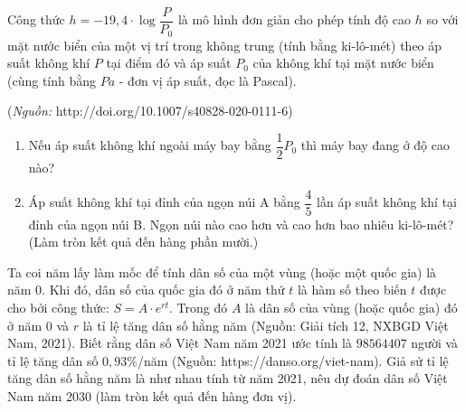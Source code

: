 \begin{bt}%
	Công thức $h=-19{,}4\cdot\log\dfrac{P}{P_0}$ là mô hình đơn giản cho phép tính độ cao $h$ so với mặt nước biển của một vị trí trong không trung (tính bằng ki-lô-mét) theo áp suất không khí $P$ tại điểm đó và áp suất $P_0$ của không khí tại mặt nước biển (cùng tính bằng $Pa$ - đơn vị áp suất, đọc là Pascal).
	\begin{center}
		(\textit{Nguồn:}  http://doi.org/10.1007/s40828-020-0111-6)
	\end{center}
	\begin{enumerate}
		\item Nếu áp suất không khí ngoài máy bay bằng $\dfrac{1}{2}P_0$ thì máy bay đang ở độ cao nào?
		\item Áp suất không khí tại đỉnh của ngọn núi A bằng $\dfrac{4}{5}$ lần áp suất không khí tại đỉnh của ngọn núi B. Ngọn núi nào cao hơn và cao hơn bao nhiêu ki-lô-mét? (Làm tròn kết quả đến hàng phần mười.)
	\end{enumerate}
\end{bt}
\begin{bt}%
	Ta coi năm lấy làm mốc để tính dân số của một vùng (hoặc một quốc gia) là năm 0. Khi đó, dân số của quốc gia đó ở năm thứ $t$ là hàm số theo biến $t$ được cho bởi công thức: $S=A \cdot e^{rt}$. Trong đó $A$ là dân số của vùng (hoặc quốc gia) đó ở năm 0 và $r$ là tỉ lệ tăng dân số hằng năm (Nguồn: Giải tích 12, NXBGD Việt Nam, 2021). Biết rằng dân số Việt Nam năm 2021 ước tính là $98564407$ người và tỉ lệ tăng dân số $0,93\%$/năm (Nguồn: https://danso.org/viet-nam). Giả sử tỉ lệ tăng dân số hằng năm là như nhau tính từ năm 2021, nêu dự đoán dân số Việt Nam năm 2030 (làm tròn kết quả đến hàng đơn vị).
\end{bt}

